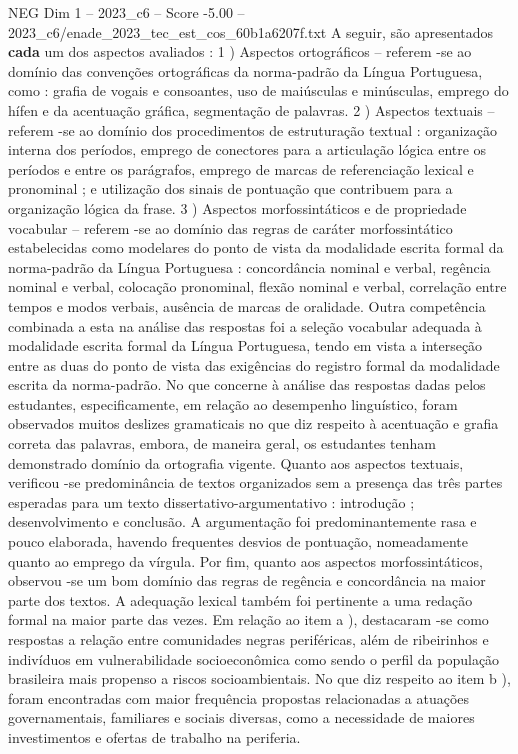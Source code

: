 \begin{textsample}{NEG Dim 1 – 2023\_c6 – Score -5.00 – 2023\_c6/enade\_2023\_tec\_est\_cos\_60b1a6207f.txt}
A seguir, são apresentados \textbf{cada} um dos aspectos avaliados : 1 ) Aspectos ortográficos – referem -se ao domínio das convenções ortográficas da norma-padrão da Língua Portuguesa, como : grafia de vogais e consoantes, uso de maiúsculas e minúsculas, emprego do hífen e da acentuação gráfica, segmentação de palavras. 2 ) Aspectos textuais – referem -se ao domínio dos procedimentos de estruturação textual : organização interna dos períodos, emprego de conectores para a articulação lógica entre os períodos e entre os parágrafos, emprego de marcas de referenciação lexical e pronominal ; e utilização dos sinais de pontuação que contribuem para a organização lógica da frase. 3 ) Aspectos morfossintáticos e de propriedade vocabular – referem -se ao domínio das regras de caráter morfossintático estabelecidas como modelares do ponto de vista da modalidade escrita formal da norma-padrão da Língua Portuguesa : concordância nominal e verbal, regência nominal e verbal, colocação pronominal, flexão nominal e verbal, correlação entre tempos e modos verbais, ausência de marcas de oralidade.
Outra competência combinada a esta na análise das respostas foi a seleção vocabular adequada à modalidade escrita formal da Língua Portuguesa, tendo em vista a interseção entre as duas do ponto de vista das exigências do registro formal da modalidade escrita da norma-padrão.
No que concerne à análise das respostas dadas pelos estudantes, especificamente, em relação ao desempenho linguístico, foram observados muitos deslizes gramaticais no que diz respeito à acentuação e grafia correta das palavras, embora, de maneira geral, os estudantes tenham demonstrado domínio da ortografia vigente.
Quanto aos aspectos textuais, verificou -se predominância de textos organizados sem a presença das três partes esperadas para um texto dissertativo-argumentativo : introdução ; desenvolvimento e conclusão.
A argumentação foi predominantemente rasa e pouco elaborada, havendo frequentes desvios de pontuação, nomeadamente quanto ao emprego da vírgula.
Por fim, quanto aos aspectos morfossintáticos, observou -se um bom domínio das regras de regência e concordância na maior parte dos textos.
A adequação lexical também foi pertinente a uma redação formal na maior parte das vezes.
Em relação ao item a ), destacaram -se como respostas a relação entre comunidades negras periféricas, além de ribeirinhos e indivíduos em vulnerabilidade socioeconômica como sendo o perfil da população brasileira mais propenso a riscos socioambientais.
No que diz respeito ao item b ), foram encontradas com maior frequência propostas relacionadas a atuações governamentais, familiares e sociais diversas, como a necessidade de maiores investimentos e ofertas de trabalho na periferia.

\end{textsample}
